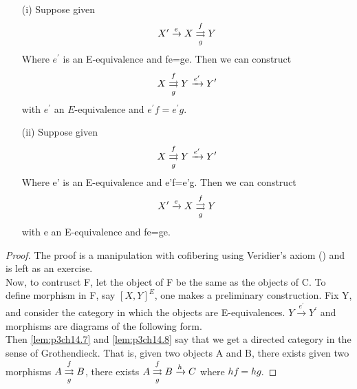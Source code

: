 \documentclass[../main]{subfiles}
\begin{document}
\begin{lemma} \label{lem:p3ch14.8}
\begin{enumerate} 
\item [(i)] Suppose given 
  $$
  X^{\prime} \xrightarrow{e} X \overunderset{f}{g}{\rightrightarrows} Y
  $$ 
  Where $e^{\prime}$ is an E-equivalence and fe=ge. Then we can construct 
  $$
  X \overunderset{f}{g}{\rightrightarrows} Y \xrightarrow{e'} Y'
  $$ 
  with $e^{\prime}$ an $E$-equivalence and  $e^{\prime}f=e^{\prime}g$.
  \item [(ii)] Suppose given 
    $$
  X \overunderset{f}{g}{\rightrightarrows} Y \xrightarrow{e'} Y'
    $$ 
      Where e' is an E-equivalence and e'f=e'g. Then we can construct
  $$
  X^{\prime} \xrightarrow{e} X \overunderset{f}{g}{\rightrightarrows} Y
  $$ 
with e an E-equivalence and fe=ge.
\end{enumerate}
\begin{proof} 
  The proof is a manipulation with cofibering using Veridier's axiom () and is left as an exercise.\\
  Now, to contrusct F, let the object of F be the same as the objects of C. To define morphism in F, say $ \left[X,Y\right]^E $, one makes a preliminary construction. Fix Y, and consider the category in which the objects are E-equivalences. $Y \xrightarrow{e^{\prime}} Y^{\prime}$ and morphisms are diagrams of the following form.\\
  Then \ref{lem:p3ch14.7} and \ref{lem:p3ch14.8} say that we get a directed category in the sense of Grothendieck. That is, given two objects A and B, there exists 
  given two morphisms $ A \overunderset{f}{g}{\rightrightarrows} B  $, there exists $  A \overunderset{f}{g}{\rightrightarrows} B \xrightarrow{h} C$ where $hf = hg$.
\end{proof}
\end{lemma}
\end{document}
